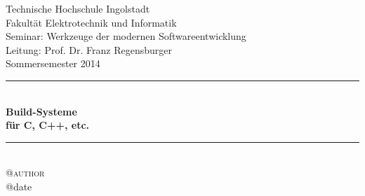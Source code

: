 \begin{titlepage}
	{
	\noindent Technische Hochschule Ingolstadt\\
	Fakultät Elektrotechnik und Informatik\\
	Seminar: Werkzeuge der modernen Softwareentwicklung\\
	Leitung: Prof. Dr. Franz Regensburger\\
	Sommersemester 2014
	}
	\center
	\rule{\textwidth}{1.5pt}\\
	\vspace{1.5em}
	{ 
		\fontsize{30pt}{36pt}\selectfont
		\textbf{Build-Systeme}
	}\\[0.5em]
	{ 
		\fontsize{20pt}{24pt}\selectfont
		\textbf{für C, C++, etc.}
	}
	\vspace{1.5em}
	\rule{\textwidth}{1.5pt}\\
	\vspace{2em}
	{
		\fontsize{16pt}{20pt}\selectfont
		\textsc{\csname @author\endcsname}
		~\\[1em]
		\csname @date\endcsname
	}

\end{titlepage}
